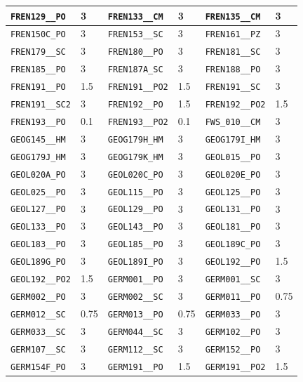 \begin{longtable}{|l|l||l|l||l|l|}
    \verb|FREN129__PO| & 3 & \verb|FREN133__CM| & 3 & \verb|FREN135__CM| & 3\\\hline
    \verb|FREN150C_PO| & 3 & \verb|FREN153__SC| & 3 & \verb|FREN161__PZ| & 3\\\hline
    \verb|FREN179__SC| & 3 & \verb|FREN180__PO| & 3 & \verb|FREN181__SC| & 3\\\hline
    \verb|FREN185__PO| & 3 & \verb|FREN187A_SC| & 3 & \verb|FREN188__PO| & 3\\\hline
    \verb|FREN191__PO| & 1.5 & \verb|FREN191__PO2| & 1.5 & \verb|FREN191__SC| & 3\\\hline
    \verb|FREN191__SC2| & 3 & \verb|FREN192__PO| & 1.5 & \verb|FREN192__PO2| & 1.5\\\hline
    \verb|FREN193__PO| & 0.1 & \verb|FREN193__PO2| & 0.1 & \verb|FWS_010__CM| & 3\\\hline
    \verb|GEOG145__HM| & 3 & \verb|GEOG179H_HM| & 3 & \verb|GEOG179I_HM| & 3\\\hline
    \verb|GEOG179J_HM| & 3 & \verb|GEOG179K_HM| & 3 & \verb|GEOL015__PO| & 3\\\hline
    \verb|GEOL020A_PO| & 3 & \verb|GEOL020C_PO| & 3 & \verb|GEOL020E_PO| & 3\\\hline
    \verb|GEOL025__PO| & 3 & \verb|GEOL115__PO| & 3 & \verb|GEOL125__PO| & 3\\\hline
    \verb|GEOL127__PO| & 3 & \verb|GEOL129__PO| & 3 & \verb|GEOL131__PO| & 3\\\hline
    \verb|GEOL133__PO| & 3 & \verb|GEOL143__PO| & 3 & \verb|GEOL181__PO| & 3\\\hline
    \verb|GEOL183__PO| & 3 & \verb|GEOL185__PO| & 3 & \verb|GEOL189C_PO| & 3\\\hline
    \verb|GEOL189G_PO| & 3 & \verb|GEOL189I_PO| & 3 & \verb|GEOL192__PO| & 1.5\\\hline
    \verb|GEOL192__PO2| & 1.5 & \verb|GERM001__PO| & 3 & \verb|GERM001__SC| & 3\\\hline
    \verb|GERM002__PO| & 3 & \verb|GERM002__SC| & 3 & \verb|GERM011__PO| & 0.75\\\hline
    \verb|GERM012__SC| & 0.75 & \verb|GERM013__PO| & 0.75 & \verb|GERM033__PO| & 3\\\hline
    \verb|GERM033__SC| & 3 & \verb|GERM044__SC| & 3 & \verb|GERM102__PO| & 3\\\hline
    \verb|GERM107__SC| & 3 & \verb|GERM112__SC| & 3 & \verb|GERM152__PO| & 3\\\hline
    \verb|GERM154F_PO| & 3 & \verb|GERM191__PO| & 1.5 & \verb|GERM191__PO2| & 1.5\\\hline

\end{longtable}
